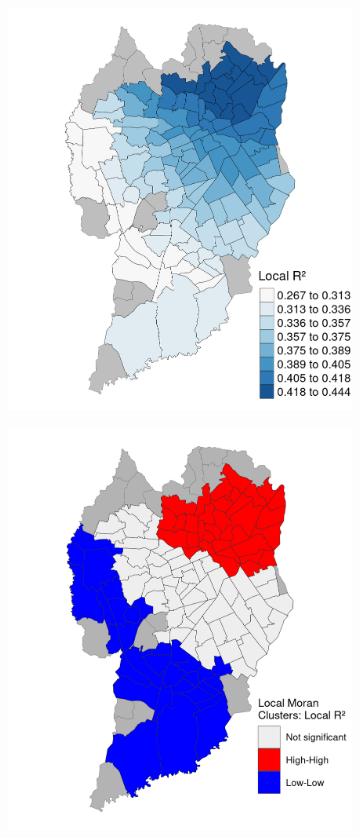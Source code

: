 \begin{figure}[!htbp]
    \centering\footnotesize
    \captionsetup{font=footnotesize}
    \caption{GW LOCAL $R^2$}
    \begin{subfigure}{0.5\textwidth}
        \includegraphics{fig/gwr_local_r2.png}
    \end{subfigure}%
    \begin{subfigure}{0.5\textwidth}
        \includegraphics{fig/lisa_local_r2.png}

\end{subfigure}
\end{figure}
